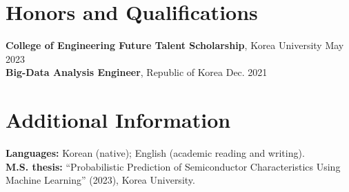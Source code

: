 \documentclass[a4paper,10pt]{article}
\begin{document}
\section{Honors and Qualifications}

\textbf{College of Engineering Future Talent Scholarship}, Korea University \hfill {\small May 2023}\\[3pt]
\textbf{Big-Data Analysis Engineer}, Republic of Korea \hfill {\small Dec. 2021}

\section{Additional Information}

\textbf{Languages:} Korean (native); English (academic reading and writing).\\[3pt]
\textbf{M.S. thesis:} ``Probabilistic Prediction of Semiconductor Characteristics Using Machine
Learning'' (2023), Korea University.
\end{document}
